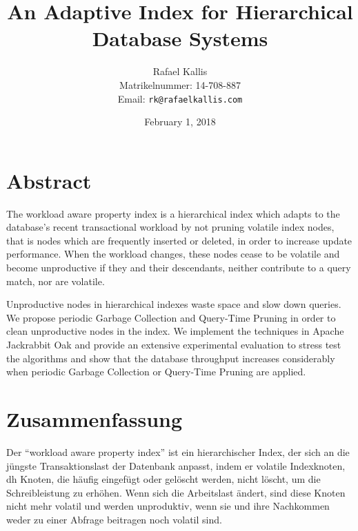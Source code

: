 \documentclass[abstracton,12pt]{scrartcl}
\title{An Adaptive Index for Hierarchical Database Systems}
\author{
    Rafael Kallis\\[-5pt]
    \scriptsize Matrikelnummer: 14-708-887\\[-5pt]
    \scriptsize Email: \texttt{rk@rafaelkallis.com}
}
\date{\vspace*{2cm}February 1, 2018}
\theoremstyle{definition}
\begin{document}
\maketitle
\thispagestyle{empty}


\newpage
\thispagestyle{empty}
\vspace*{7cm}

\section*{Abstract}

The workload aware property index is a hierarchical index which adapts to the
database's recent transactional workload by not pruning volatile index nodes,
that is nodes which are frequently inserted or deleted, in order to increase
update performance. When the workload changes, these nodes cease to be volatile
and become unproductive if they and their descendants, neither contribute to a
query match, nor are volatile.

Unproductive nodes in hierarchical indexes waste space and slow down queries.
We propose periodic Garbage Collection and Query-Time Pruning in order to
clean unproductive nodes in the index. We implement the techniques in Apache
Jackrabbit Oak and
provide an extensive experimental evaluation to stress test the algorithms and
show that the database throughput increases considerably when periodic Garbage
Collection or Query-Time Pruning are applied.

\newpage
\thispagestyle{empty}
\vspace*{7cm}

\section*{Zusammenfassung}

Der ``workload aware property index'' ist ein hierarchischer Index, der sich an
die jüngste Transaktionslast der Datenbank anpasst, indem er volatile
Indexknoten, dh Knoten, die häufig eingefügt oder gelöscht werden, nicht löscht,
um die Schreibleistung zu erhöhen. Wenn sich die Arbeitslast ändert, sind
diese Knoten nicht mehr volatil und werden unproduktiv, wenn sie und ihre
Nachkommen weder zu einer Abfrage beitragen noch volatil sind.
\end{document}
